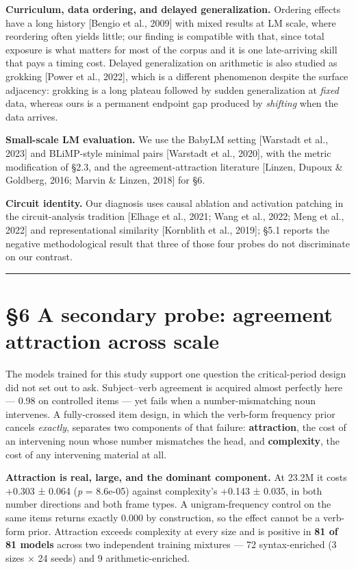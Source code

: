 \documentclass{article}
\begin{document}
\textbf{Curriculum, data ordering, and delayed generalization.} Ordering effects have a long
history {[}Bengio et al., 2009{]} with mixed results at LM scale, where reordering often yields
little; our finding is compatible with that, since total exposure is what matters for most
of the corpus and it is one late-arriving skill that pays a timing cost. Delayed
generalization on arithmetic is also studied as grokking {[}Power et al., 2022{]}, which is a
different phenomenon despite the surface adjacency: grokking is a long plateau followed by
sudden generalization at \emph{fixed} data, whereas ours is a permanent endpoint gap produced by
\emph{shifting} when the data arrives.

\textbf{Small-scale LM evaluation.} We use the BabyLM setting {[}Warstadt et al., 2023{]} and
BLiMP-style minimal pairs {[}Warstadt et al., 2020{]}, with the metric modification of §2.3, and
the agreement-attraction literature {[}Linzen, Dupoux \& Goldberg, 2016; Marvin \& Linzen, 2018{]}
for §6.

\textbf{Circuit identity.} Our diagnosis uses causal ablation and activation patching in the
circuit-analysis tradition {[}Elhage et al., 2021; Wang et al., 2022; Meng et al., 2022{]} and
representational similarity {[}Kornblith et al., 2019{]}; §5.1 reports the negative
methodological result that three of those four probes do not discriminate on our contrast.

\begin{center}\rule{0.5\linewidth}{0.5pt}\end{center}

\section{§6 A secondary probe: agreement attraction across scale}\label{a-secondary-probe-agreement-attraction-across-scale}

The models trained for this study support one question the critical-period design did not
set out to ask. Subject--verb agreement is acquired almost perfectly here --- 0.98 on
controlled items --- yet fails when a number-mismatching noun intervenes. A fully-crossed item
design, in which the verb-form frequency prior cancels \emph{exactly},
separates two components of that failure: \textbf{attraction}, the cost of an intervening noun
whose number mismatches the head, and \textbf{complexity}, the cost of any intervening material
at all.

\textbf{Attraction is real, large, and the dominant component.} At 23.2M it costs
+0.303 ± 0.064 (\emph{p} = 8.6e-05) against complexity's +0.143 ± 0.035, in both number
directions and both frame types. A unigram-frequency control on the same items returns
exactly 0.000 by construction, so the effect cannot be a verb-form prior. Attraction exceeds
complexity at every size and is positive in \textbf{81 of 81 models} across two independent
training mixtures --- 72 syntax-enriched (3 sizes × 24 seeds) and 9 arithmetic-enriched.
\end{document}
